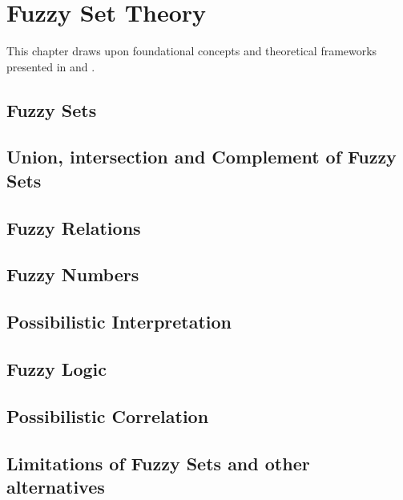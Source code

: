 \chapter{Fuzzy Set Theory}
This chapter draws upon foundational concepts and theoretical frameworks presented in \cite{FULLER1} and \cite{FULLER2}. 

\section{Fuzzy Sets}

\section{Union, intersection and Complement of Fuzzy Sets}

\section{Fuzzy Relations}

\section{Fuzzy Numbers}\label{sec:fuzzy_numbers}

\section{Possibilistic Interpretation}

\section{Fuzzy Logic}\label{sec:fuzzy_logic}


\section{Possibilistic Correlation}
\section{Limitations of Fuzzy Sets and other alternatives}
